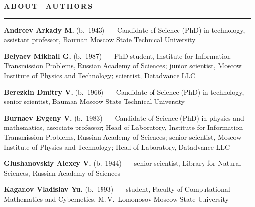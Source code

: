 \def\stat{authors}
{%
\raggedleft\Large \bf%
A\,B\,O\,U\,T\  \  A\,U\,T\,H\,O\,R\,S \vskip 17pt
    \hrule
    \par
{} }

\label{st\stat}


\def\leftkol{ABOUT AUTHORS} %
\def\rightkol{\ } %


\vspace*{36pt}

\begin{multicols}{2}


\noindent \textbf{Andreev Arkady M.} (b.\ 1943)~--- Candidate of Science (PhD) in 
technology, assistant professor, Bauman Moscow State Technical University

\vspace*{4pt}

\vspace*{4pt}

\noindent
\textbf{Belyaev Mikhail G.} (b.\ 1987)~--- PhD student, Institute for Information 
Transmission Problems, Russian Academy of Sciences; junior scientist, Moscow 
Institute of Physics and Technology; scientist, Datadvance LLC

\vspace*{4pt}

\noindent
\textbf{Berezkin Dmitry V.} (b.\ 1966)~--- Candidate of Science (PhD) in technology, senior 
scientist, Bauman Moscow State Technical University


\vspace*{4pt}

\noindent
\textbf{Burnaev Evgeny V.} (b.\ 1983)~--- Candidate of Science (PhD) in physics and 
mathematics, associate professor; Head of Laboratory, Institute for Information 
Transmission Problems, Russian Academy of Sciences; senior scientist, Moscow 
Institute of Physics and Technology; Head of Laboratory, Datadvance LLC

\vspace*{4pt}

\noindent
\textbf{Glushanovskiy Alexey V.} (b.\ 1944)~--- senior scientist, Library for Natural 
Sciences, Russian Academy of Sciences

\vspace*{4pt}

\noindent
\textbf{Kaganov Vladislav Yu.} (b.\ 1993)~--- student, Faculty of Computational Mathematics 
and Cybernetics, M.\,V.~Lomonosov Moscow State University



\end{multicols}
